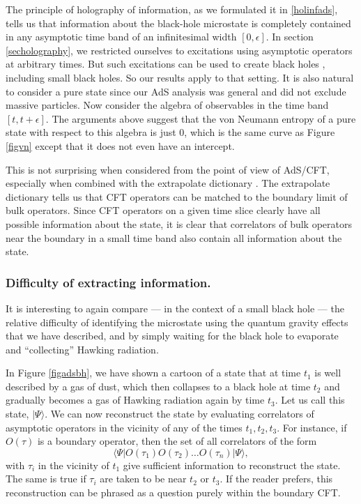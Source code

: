 \documentclass[12pt]{article}
\newcommand{\be}{\begin{equation}}
\newcommand{\ee}{\end{equation}}
\begin{document}
The principle of holography of information, as we formulated it in \ref{holinfads}, tells us that information about the black-hole microstate is completely contained in any asymptotic time band of an infinitesimal width $[0, \epsilon]$. In section
 \ref{secholography}, we restricted ourselves to excitations using asymptotic operators at arbitrary times. But such excitations can be used to create black holes \cite{Bhattacharyya:2009uu}, including small black holes. So our results apply to that setting.  It is also natural to consider a pure state since our AdS analysis was general and did not exclude massive particles. Now consider the algebra of observables in the time band $[t, t + \epsilon]$.  The arguments above suggest that the von Neumann entropy of a pure state with respect to this algebra is just $0$, which is the same curve as Figure \ref{figvn} except that it does not even have an intercept.

This is not surprising when considered from the point of view of AdS/CFT, especially when combined with the extrapolate dictionary \cite{Banks:1998dd}. The extrapolate dictionary tells us that CFT operators can be matched to the boundary limit of bulk operators. Since CFT operators on a given time slice clearly have all possible information about the state, it is clear that correlators of bulk operators near the boundary in a small time band also contain all information about the state.

\subsubsection*{Difficulty of extracting information.}
It is interesting to again compare --- in the context of a small black hole --- the relative difficulty of identifying the microstate using the quantum gravity effects that we have described,  and by simply waiting for the black hole to evaporate and ``collecting'' Hawking radiation.

In Figure \ref{figadsbh}, we have shown a cartoon of a state that at time $t_1$ is well described by a gas of dust, which then collapses to a black hole at time $t_2$ and gradually becomes a gas of Hawking radiation again by time $t_3$.  Let us call this state, $|\Psi \rangle$.  We can now reconstruct the state by evaluating correlators of asymptotic operators in the vicinity of  any of the times $t_1, t_2, t_3$. For instance, if $O(\tau)$ is a boundary operator, then the set of all correlators of the form
\be
\langle \Psi | O(\tau_{1}) O(\tau_{2}) \ldots O(\tau_{n}) |\Psi \rangle,
\ee
with $\tau_i$ in the vicinity of $t_1$ give sufficient information to reconstruct the state. The same is true if $\tau_i$ are taken to be near $t_2$ or $t_3$.  If the reader prefers, this reconstruction can be phrased as a question purely within the boundary CFT.
\end{document}
